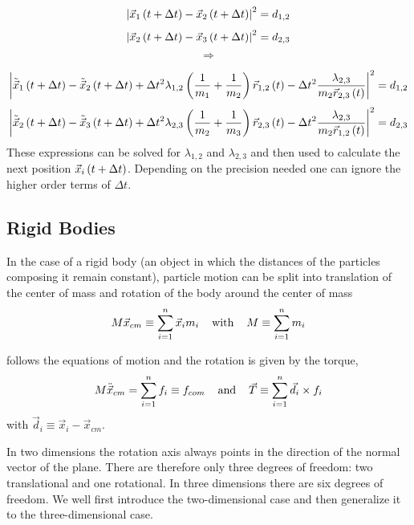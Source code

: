 $$
\left|\vec{x}_1 \left(t+\Delta t\right) - \vec{x}_2 \left(t+\Delta t\right)\right|^2 = d_{1,2}
$$
$$
\left|\vec{x}_2 \left(t+\Delta t\right) - \vec{x}_3 \left(t+\Delta t\right)\right|^2 = d_{2,3}
$$
$$
\Rightarrow
$$

$$
\left|      \tilde{ \vec{x}}_1 \left(t+\Delta t\right) -\tilde{  \vec{x}}_2 \left(t+\Delta t\right) + \Delta t^2 \lambda_{1,2} \left(\frac{1}{m_1} +\frac{1}{m_2}\right)\vec{r}_{1,2}\left(t\right)  - \Delta t^2 \frac{\lambda_{2,3}}{m_2 \vec{r}_{2,3}\left(t\right)}        \right|^2 = d_{1,2}
$$
$$
\left|      \tilde{  \vec{x}}_2 \left(t+\Delta t\right) - \tilde{ \vec{x}}_3 \left(t+\Delta t\right) + \Delta t^2 \lambda_{2,3} \left(\frac{1}{m_2} +\frac{1}{m_3}\right)\vec{r}_{2,3}\left(t\right)  - \Delta t^2 \frac{\lambda_{2,3}}{m_2 \vec{r}_{1,2}\left(t\right)}        \right|^2 = d_{2,3}
$$
These expressions can be solved  for $\lambda_{1,2}$ and $\lambda_{2,3}$ and then used to calculate the next position $\vec{x}_i\left(t+\Delta t\right)$. Depending on the precision needed one can ignore the higher order terms of $\Delta t$.


\subsection{Rigid Bodies}
In the case of a rigid body (an object in which the distances of the particles composing it remain constant), particle motion can be split into translation of the center of mass and rotation of the body around the center of mass
\begin{equation}
M\vec{x}_{cm} \equiv \sum_{i=1}^n{\vec{x}_im_i}
\hspace{0.4cm}\text{with}\hspace{0.4cm} 
M\equiv \sum_{i=1}^n{m_i}
\label{eq:center_of_mass}
\end{equation}

follows the equations of motion and the rotation is given by the torque,
\begin{equation}
M\ddot{\vec{x}}_{cm} = \sum_{i=1}^n{f_i} \equiv f_{com}
\hspace{0.4cm}\text{and}\hspace{0.4cm} 
\vec{T} \equiv \sum_{i=1}^n{     \vec{d}_i \times     f_i   }
\label{eq:cof_eom}
\end{equation}
with $\vec{d}_i \equiv \vec{x}_i - \vec{x}_{cm}$.

In two dimensions  the rotation axis always points in the direction of the normal vector of the plane. There are therefore only three degrees of freedom: two translational and one rotational. In three dimensions there are six degrees of freedom. We well first introduce the two-dimensional case and then generalize it to the three-dimensional case.


